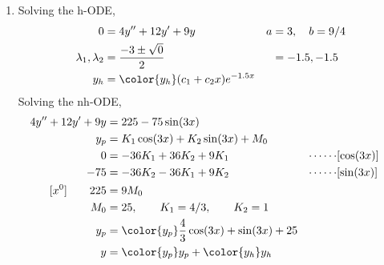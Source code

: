 \begin{enumerate}
    \item Solving the h-ODE,
          \begin{align}
              0                        & = 4y'' + 12y' + 9y                      &
              a                        & = 3, \quad b = 9/4                        \\
              \lambda_{1}, \lambda_{2} & = \frac{-3 \pm \sqrt{0}}{2}             &
                                       & = -1.5, -1.5                              \\
              y_{h}                    & = \color{y_h} (c_{1} + c_{2}x)e^{-1.5x}
          \end{align}
          Solving the nh-ODE,
          \begin{align}
              4y'' + 12y' + 9y   & = 225 - 75\sin(3x)                                  \\
              y_{p}              & = K_{1} \cos(3x) + K_{2} \sin(3x) + M_{0}           \\
              0                  & = -36K_{1} + 36K_{2} + 9K_{1}                     &
              \cdots\cdots       & [\cos(3x)]                                          \\
              -75                & = -36K_{2} - 36K_{1} + 9K_{2}                     &
              \cdots\cdots       & [\sin(3x)]                                          \\
              [x^{0}] \qquad 225 & = 9M_{0}                                            \\
              M_{0}              & = 25, \qquad K_{1} = 4/3, \qquad K_{2} = 1          \\
              y_{p}              & = \color{y_p} \frac{4}{3}\cos(3x) + \sin(3x) + 25   \\
              y                  & = {\color{y_p} y_{p}} + {\color{y_h} y_{h}}
          \end{align}


\end{enumerate}

